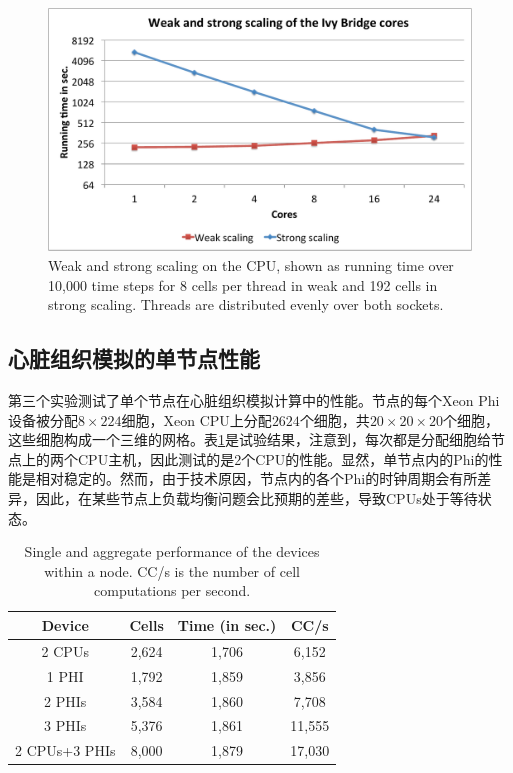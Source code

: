 \begin{figure}[htb]
\includegraphics[width=\linewidth]{figs/weakstrongscaleCPU.pdf}
\caption{Weak and strong scaling on the CPU, shown as running time over 10,000 time steps for $8$ cells per thread in weak and 192 cells in strong scaling. Threads are distributed evenly over both sockets.}
\label{fig:scaling2}
\end{figure}

\subsection{心脏组织模拟的单节点性能}
第三个实验测试了单个节点在心脏组织模拟计算中的性能。节点的每个Xeon Phi设备被分配$8\times224$细胞，Xeon CPU上分配$2624$个细胞，共$20\times20\times20$个细胞，这些细胞构成一个三维的网格。表\ref{tbl:perf1}是试验结果，注意到，每次都是分配细胞给节点上的两个CPU主机，因此测试的是2个CPU的性能。显然，单节点内的Phi的性能是相对稳定的。然而，由于技术原因，节点内的各个Phi的时钟周期会有所差异，因此，在某些节点上负载均衡问题会比预期的差些，导致CPUs处于等待状态。

\begin{table}
\caption{Single and aggregate performance of the devices within a node. CC/s is the number of cell computations per second.}
\label{tbl:perf1}
\begin{center}
\begin{tabular}{c|ccc}
Device & Cells & Time (in sec.) & CC/s \\
\hline
2 CPUs	&	2,624	&	1,706	&	6,152	\\	
1 PHI	&	1,792	&	1,859	&	3,856	\\	
2 PHIs	&	3,584	&	1,860	&	7,708	\\	
3 PHIs	&	5,376	&	1,861	&	11,555	\\	
2 CPUs+3 PHIs	&	8,000	&	1,879	&	17,030	\\	
\end{tabular}
\end{center}
\end{table}

